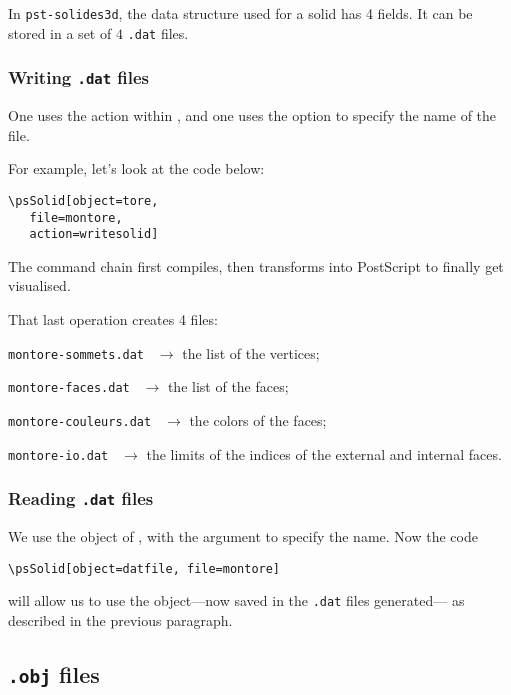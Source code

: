 In \texttt{pst-solides3d}, the data structure used for a solid has 4 fields.
It can be stored in a set of $4$
\texttt{.dat} files.


\subsubsection{Writing \texttt{.dat} files}

One uses the action  within , and one
uses the option  to specify the name of the file.

For example, let's look at the code below:
\begin{verbatim}
\psSolid[object=tore,
   file=montore,
   action=writesolid]
\end{verbatim}

The command chain
first compiles, then transforms into PostScript to finally get
visualised.

That last operation creates 4 files:
\begin{compactitem}
  \item \texttt{montore-sommets.dat  } $\rightarrow$ the list of the vertices;
  \item \texttt{montore-faces.dat    } $\rightarrow$ the list of the faces;
  \item \texttt{montore-couleurs.dat } $\rightarrow$ the colors of the faces;
  \item \texttt{montore-io.dat       } $\rightarrow$ the limits of the indices
  of the external and internal faces.
\end{compactitem}

\subsubsection{Reading \texttt{.dat} files}

We use the object  of , with the argument
 to specify the name.
Now the code
\begin{verbatim}
\psSolid[object=datfile, file=montore]
\end{verbatim}
will allow us to use the object---now saved in the \texttt{.dat} files generated---
as described in the previous paragraph.

\subsection{\texttt{.obj} files}

